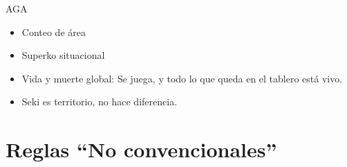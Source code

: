 \documentclass{beamer}
\begin{document}
\begin{frame}{AGA}
    \begin{itemize}
        \item Conteo de área
        \item Superko situacional
        \item Vida y muerte global: Se juega, y todo lo que queda en el tablero está vivo.
        \item Seki es territorio, no hace diferencia.
    \end{itemize}
\end{frame}


\section{Reglas ``No convencionales''}

%
% 
%
%    
%
%
%
%
%
%
%
\end{document}
